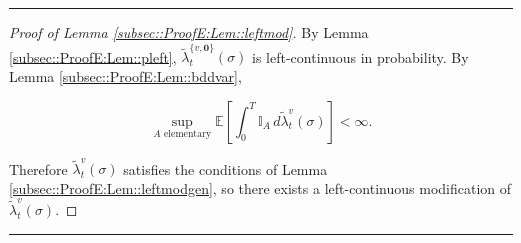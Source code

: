 \documentclass[12pt]{article}
\newcommand{\mb}{\mathbb}
\newcommand{\te}{\text}
\newcommand{\lin}{\rule{\linewidth}{0.4 pt}}
\newcommand{\ex}[1]{\mb{E}\left[#1\right]}			%
\renewcommand{\root}{\mathbf{0}}				%
\renewcommand{\v}{v}							%
\renewcommand{\S}{S}							%
\newcommand{\s}{\sigma}							%
\newcommand{\T}{T}								%
\renewcommand{\t}{t}							%
\newcommand{\vind}[1]{^{#1}}					%
\newcommand{\ts}[1]{_{#1}}						%
\newcommand{\alt}[1]{\widetilde{#1}}			%
\newcommand{\typset}{A}							%
\newcommand{\crate}{\alt{\lambda}}				%
\begin{document}
\lin

\begin{proof}[Proof of Lemma \ref{subsec::ProofE:Lem::leftmod}]

By Lemma \ref{subsec::ProofE:Lem::pleft}, \(\crate\vind{\{\v,\root\}}\ts{\t}(\s)\) is left-continuous in probability. By Lemma \ref{subsec::ProofE:Lem::bddvar},

\[\sup_{\typset\te{ elementary}} \ex{\int_0^\T \mb{I}_{\typset}\,d\crate\vind{\v}\ts{\t}(\s)} < \infty.\]

Therefore \(\crate\vind{\v}\ts{\t}(\s)\) satisfies the conditions of Lemma \ref{subsec::ProofE:Lem::leftmodgen}, so there exists a left-continuous modification of \(\crate\vind{\v}\ts{\t}(\s)\).
\end{proof}

\lin
\end{document}
